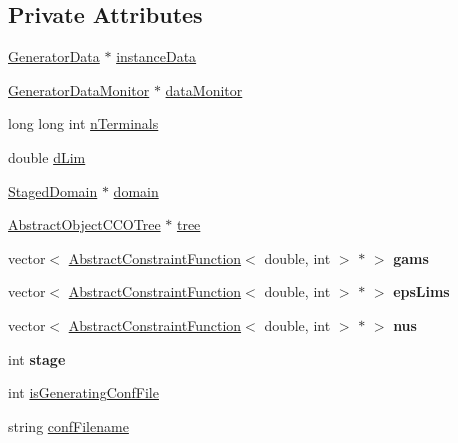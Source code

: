 \subsection*{Private Attributes}
\begin{DoxyCompactItemize}
\item 
\hyperlink{class_generator_data}{Generator\+Data} $\ast$ \hyperlink{class_staged_f_r_r_o_tree_generator_aa5d549a1ae7bfce749e418301ba92a2f}{instance\+Data}
\item 
\hyperlink{class_generator_data_monitor}{Generator\+Data\+Monitor} $\ast$ \hyperlink{class_staged_f_r_r_o_tree_generator_ad8b06f3c348ba21d7a2eead895fa19c2}{data\+Monitor}
\item 
long long int \hyperlink{class_staged_f_r_r_o_tree_generator_a4b9c21f516630824f8057aae16f38918}{n\+Terminals}
\item 
double \hyperlink{class_staged_f_r_r_o_tree_generator_a7f36129068076eb3a54f051aa12cda40}{d\+Lim}
\item 
\hyperlink{class_staged_domain}{Staged\+Domain} $\ast$ \hyperlink{class_staged_f_r_r_o_tree_generator_a2f8616a24551a7a414b51b805309894a}{domain}
\item 
\hyperlink{class_abstract_object_c_c_o_tree}{Abstract\+Object\+C\+C\+O\+Tree} $\ast$ \hyperlink{class_staged_f_r_r_o_tree_generator_a3d7a0b0194b93d4c2706a21908ad9f09}{tree}
\item 
vector$<$ \hyperlink{class_abstract_constraint_function}{Abstract\+Constraint\+Function}$<$ double, int $>$ $\ast$ $>$ {\bfseries gams}\hypertarget{class_staged_f_r_r_o_tree_generator_a81551e7195317a26d1a12936590031ce}{}\label{class_staged_f_r_r_o_tree_generator_a81551e7195317a26d1a12936590031ce}

\item 
vector$<$ \hyperlink{class_abstract_constraint_function}{Abstract\+Constraint\+Function}$<$ double, int $>$ $\ast$ $>$ {\bfseries eps\+Lims}\hypertarget{class_staged_f_r_r_o_tree_generator_a1267c3bf746b17812daf41cd7e89b7e6}{}\label{class_staged_f_r_r_o_tree_generator_a1267c3bf746b17812daf41cd7e89b7e6}

\item 
vector$<$ \hyperlink{class_abstract_constraint_function}{Abstract\+Constraint\+Function}$<$ double, int $>$ $\ast$ $>$ {\bfseries nus}\hypertarget{class_staged_f_r_r_o_tree_generator_a48c89ee980293fc8c5188bbfd8bcbb08}{}\label{class_staged_f_r_r_o_tree_generator_a48c89ee980293fc8c5188bbfd8bcbb08}

\item 
int {\bfseries stage}\hypertarget{class_staged_f_r_r_o_tree_generator_a9410e8bb105a69fc8636e718e7ac9dfc}{}\label{class_staged_f_r_r_o_tree_generator_a9410e8bb105a69fc8636e718e7ac9dfc}

\item 
int \hyperlink{class_staged_f_r_r_o_tree_generator_a0b79edc4a184c376ab11260603004932}{is\+Generating\+Conf\+File}
\item 
string \hyperlink{class_staged_f_r_r_o_tree_generator_a244b1c195aa8395242deeeadb3ecf657}{conf\+Filename}
\end{DoxyCompactItemize}


